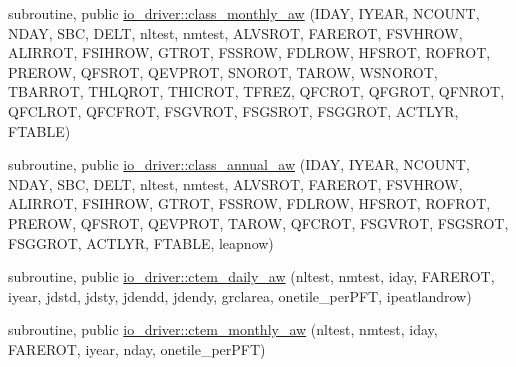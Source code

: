 {\bf }\par
\begin{DoxyCompactItemize}
\item 
subroutine, public \hyperlink{group__io__driver__class__monthly__aw_ga58c2e12621635a74096a8f7c142f85de}{io\+\_\+driver\+::class\+\_\+monthly\+\_\+aw} (I\+D\+A\+Y, I\+Y\+E\+A\+R, N\+C\+O\+U\+N\+T, N\+D\+A\+Y, S\+B\+C, D\+E\+L\+T, nltest, nmtest, A\+L\+V\+S\+R\+O\+T, F\+A\+R\+E\+R\+O\+T, F\+S\+V\+H\+R\+O\+W, A\+L\+I\+R\+R\+O\+T, F\+S\+I\+H\+R\+O\+W, G\+T\+R\+O\+T, F\+S\+S\+R\+O\+W, F\+D\+L\+R\+O\+W, H\+F\+S\+R\+O\+T, R\+O\+F\+R\+O\+T, P\+R\+E\+R\+O\+W, Q\+F\+S\+R\+O\+T, Q\+E\+V\+P\+R\+O\+T, S\+N\+O\+R\+O\+T, T\+A\+R\+O\+W, W\+S\+N\+O\+R\+O\+T, T\+B\+A\+R\+R\+O\+T, T\+H\+L\+Q\+R\+O\+T, T\+H\+I\+C\+R\+O\+T, T\+F\+R\+E\+Z, Q\+F\+C\+R\+O\+T, Q\+F\+G\+R\+O\+T, Q\+F\+N\+R\+O\+T, Q\+F\+C\+L\+R\+O\+T, Q\+F\+C\+F\+R\+O\+T, F\+S\+G\+V\+R\+O\+T, F\+S\+G\+S\+R\+O\+T, F\+S\+G\+G\+R\+O\+T, A\+C\+T\+L\+Y\+R, F\+T\+A\+B\+L\+E)
\end{DoxyCompactItemize}

{\bf }\par
\begin{DoxyCompactItemize}
\item 
subroutine, public \hyperlink{group__io__driver__class__annual__aw_ga0f389a580ed1952081408efc5dee850b}{io\+\_\+driver\+::class\+\_\+annual\+\_\+aw} (I\+D\+A\+Y, I\+Y\+E\+A\+R, N\+C\+O\+U\+N\+T, N\+D\+A\+Y, S\+B\+C, D\+E\+L\+T, nltest, nmtest, A\+L\+V\+S\+R\+O\+T, F\+A\+R\+E\+R\+O\+T, F\+S\+V\+H\+R\+O\+W, A\+L\+I\+R\+R\+O\+T, F\+S\+I\+H\+R\+O\+W, G\+T\+R\+O\+T, F\+S\+S\+R\+O\+W, F\+D\+L\+R\+O\+W, H\+F\+S\+R\+O\+T, R\+O\+F\+R\+O\+T, P\+R\+E\+R\+O\+W, Q\+F\+S\+R\+O\+T, Q\+E\+V\+P\+R\+O\+T, T\+A\+R\+O\+W, Q\+F\+C\+R\+O\+T, F\+S\+G\+V\+R\+O\+T, F\+S\+G\+S\+R\+O\+T, F\+S\+G\+G\+R\+O\+T, A\+C\+T\+L\+Y\+R, F\+T\+A\+B\+L\+E, leapnow)
\end{DoxyCompactItemize}

{\bf }\par
\begin{DoxyCompactItemize}
\item 
subroutine, public \hyperlink{group__io__driver__ctem__daily__aw_gaabb54fc6376839cc19d2b3591a963802}{io\+\_\+driver\+::ctem\+\_\+daily\+\_\+aw} (nltest, nmtest, iday, F\+A\+R\+E\+R\+O\+T, iyear, jdstd, jdsty, jdendd, jdendy, grclarea, onetile\+\_\+per\+P\+F\+T, ipeatlandrow)
\end{DoxyCompactItemize}

{\bf }\par
\begin{DoxyCompactItemize}
\item 
subroutine, public \hyperlink{group__io__driver__ctem__monthly__aw_gaefba66acca4c5138cfa2500f7a030022}{io\+\_\+driver\+::ctem\+\_\+monthly\+\_\+aw} (nltest, nmtest, iday, F\+A\+R\+E\+R\+O\+T, iyear, nday, onetile\+\_\+per\+P\+F\+T)
\end{DoxyCompactItemize}

